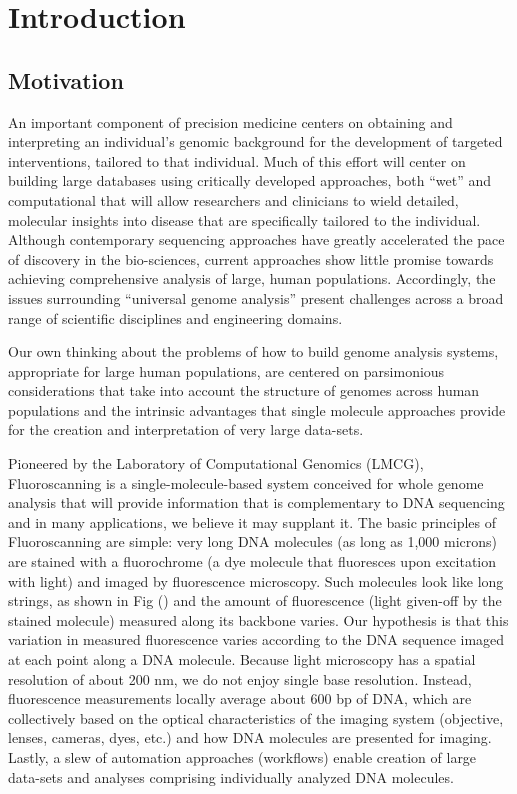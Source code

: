 \section{Introduction}

\subsection{Motivation}
An important component of precision medicine centers on obtaining and interpreting an individual's genomic background for the development of targeted interventions, tailored to that individual. Much of this effort will center on building large databases using critically developed approaches, both ``wet'' and computational that will allow researchers and clinicians to wield detailed, molecular insights into disease that are specifically tailored to the individual. Although contemporary sequencing approaches have greatly accelerated the pace of discovery in the bio-sciences, current approaches show little promise towards achieving comprehensive analysis of large, human populations. Accordingly, the issues surrounding ``universal genome analysis'' present challenges across a broad range of scientific disciplines and engineering domains.

Our own thinking about the problems of how to build genome analysis systems, appropriate for large human populations, are centered on parsimonious considerations that take into account the structure of genomes across human populations and the intrinsic advantages that single molecule approaches provide for the creation and interpretation of very large data-sets.

Pioneered by the Laboratory of Computational Genomics (LMCG), Fluoroscanning is a single-molecule-based system conceived for whole genome analysis that will provide information that is complementary to DNA sequencing and in many applications, we believe it may supplant it. The basic principles of Fluoroscanning are simple: very long DNA molecules (as long as 1,000 microns) are stained with a fluorochrome (a dye molecule that fluoresces upon excitation with light) and imaged by fluorescence microscopy. Such molecules look like long strings, as shown in Fig () and the amount of
fluorescence (light given-off by the stained molecule) measured along its backbone varies. Our hypothesis is that this variation in measured fluorescence varies according to the DNA sequence imaged at each point along a DNA molecule. Because light microscopy has a spatial resolution of about 200 nm, we do not enjoy single base resolution. Instead, fluorescence measurements locally average about 600 bp of DNA, which are collectively based on the optical characteristics of the imaging system (objective, lenses, cameras, dyes, etc.) and how DNA molecules are presented for imaging. Lastly, a slew of automation approaches (workflows) enable creation of large data-sets and analyses comprising individually analyzed DNA molecules.


